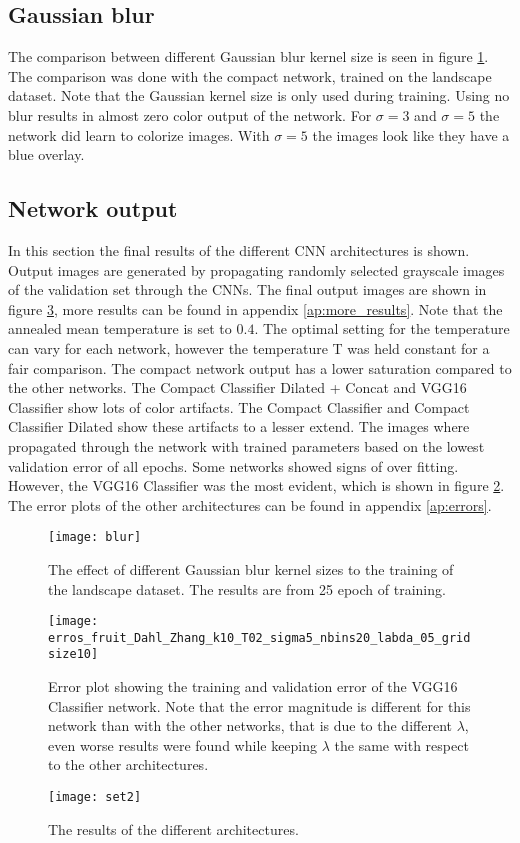 \subsection{Gaussian blur}
The comparison between different Gaussian blur kernel size is seen in figure \ref{fig:blur}. The comparison was done with the compact network, trained on the landscape dataset. Note that the Gaussian kernel size is only used during training. Using no blur results in almost zero color output of the network. For $\sigma = 3$ and $\sigma = 5$ the network did learn to colorize images. With $\sigma = 5$ the images look like they have a blue overlay.



\subsection{Network output}
In this section the final results of the different CNN architectures is shown. Output images are generated by propagating randomly selected grayscale images of the validation set through the CNNs. The final output images are shown in figure \ref{fig:results}, more results can be found in appendix \ref{ap:more_results}. Note that the annealed mean temperature is set to $0.4$. The optimal setting for the temperature can vary for each network, however the temperature T was held constant for a fair comparison. The compact network output has a lower saturation compared to the other networks. The Compact Classifier Dilated + Concat and VGG16 Classifier show lots of color artifacts. The Compact Classifier and Compact Classifier Dilated show these artifacts to a lesser extend. The images where propagated through the network with trained parameters based on the lowest validation error of all epochs. Some networks showed signs of over fitting. However, the VGG16 Classifier was the most evident, which is shown in figure \ref{fig:overfit}. The error plots of the other architectures can be found in appendix \ref{ap:errors}.

\begin{figure}[h]
	\centering
	\texttt{[image: blur]}
	\caption{The effect of different Gaussian blur kernel sizes to the training of the landscape dataset. The results are from 25 epoch of training.}
	\label{fig:blur}
\end{figure}

\begin{figure}[h!]
	\centering
	\texttt{[image: erros\_fruit\_Dahl\_Zhang\_k10\_T02\_sigma5\_nbins20\_labda\_05\_gridsize10]}
	\caption{Error plot showing the training and validation error of the VGG16 Classifier network. Note that the error magnitude is different for this network than with the other networks, that is due to the different $\lambda$, even worse results were found while keeping $\lambda$ the same with respect to the other architectures.}
	\label{fig:overfit}
\end{figure}

\clearpage
\begin{figure}[h!]
	\centering
	\texttt{[image: set2]}
	\caption{The results of the different architectures.}
	\label{fig:results}
\end{figure}



